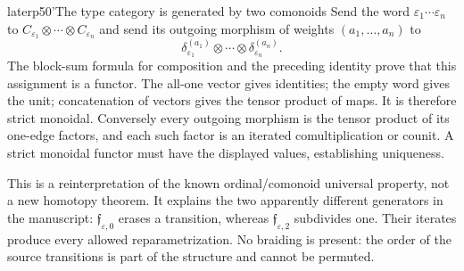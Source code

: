 \begin{dcomment}{later}{p50'}{The type category is generated by two comonoids}
Send the word $\varepsilon_1\cdots\varepsilon_n$ to
$C_{\varepsilon_1}\otimes\cdots\otimes C_{\varepsilon_n}$ and send its outgoing morphism of weights $(a_1,\ldots,a_n)$ to
\[
 \delta_{\varepsilon_1}^{(a_1)}\otimes\cdots\otimes
 \delta_{\varepsilon_n}^{(a_n)}.
\]
The block-sum formula for composition and the preceding identity prove that this assignment is a functor. The all-one vector gives identities; the empty word gives the unit; concatenation of vectors gives the tensor product of maps. It is therefore strict monoidal. Conversely every outgoing morphism is the tensor product of its one-edge factors, and each such factor is an iterated comultiplication or counit. A strict monoidal functor must have the displayed values, establishing uniqueness.

This is a reinterpretation of the known ordinal/comonoid universal property, not a new homotopy theorem. It explains the two apparently different generators in the manuscript: $\mathfrak f_{\varepsilon,0}$ erases a transition, whereas $\mathfrak f_{\varepsilon,2}$ subdivides one. Their iterates produce every allowed reparametrization. No braiding is present: the order of the source transitions is part of the structure and cannot be permuted.
\end{dcomment}


